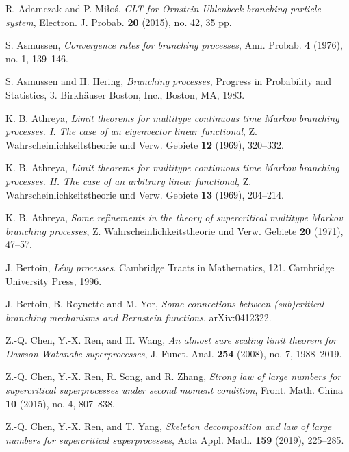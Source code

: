 \documentclass[12pt,a4paper]{amsart}
\theoremstyle{plain}
\theoremstyle{definition}
\numberwithin{equation}{section}
\begin{document}
\begin{thebibliography}{10}

  R. Adamczak and P. Mi{\l}o\'{s}, \emph{C{LT} for {O}rnstein-{U}hlenbeck branching particle system},
  Electron. J. Probab. \textbf{20} (2015), no. 42, 35 pp.

  S. Asmussen, \emph{Convergence rates for branching processes},
  Ann. Probab.  \textbf{4} (1976), no. 1, 139--146.

  S. Asmussen and H. Hering, \emph{Branching processes},
  Progress in Probability and Statistics, 3. Birkh\"{a}user Boston, Inc., Boston, MA, 1983.

  K. B. Athreya,
  \emph{Limit theorems for multitype continuous time {M}arkov branching processes. {I}. {T}he case of an eigenvector linear functional},
  Z. Wahrscheinlichkeitstheorie und Verw. Gebiete \textbf{12} (1969), 320--332.

  K. B. Athreya,
  \emph{Limit theorems for multitype continuous time {M}arkov branching processes. {II}. {T}he case of an arbitrary linear functional},
  Z. Wahrscheinlichkeitstheorie und Verw. Gebiete \textbf{13} (1969), 204--214.

  K. B. Athreya,
  \emph{Some refinements in the theory of supercritical multitype {M}arkov branching processes},
  Z. Wahrscheinlichkeitstheorie und Verw. Gebiete \textbf{20} (1971), 47--57.


J. Bertoin,
\emph{L\'evy processes}.
Cambridge Tracts in Mathematics, 121. Cambridge
University Press, 1996.

J. Bertoin, B. Roynette and M. Yor,
\emph{Some connections between (sub)critical branching mechanisms and Bernstein functions}.
arXiv:0412322.


  Z.-Q. Chen, Y.-X. Ren, and H. Wang,
  \emph{An almost sure scaling limit theorem for {D}awson-{W}atanabe superprocesses},
  J. Funct. Anal. \textbf{254} (2008), no. 7, 1988--2019.

   Z.-Q. Chen, Y.-X. Ren, R. Song, and R. Zhang,
   \emph{Strong law of large numbers for supercritical superprocesses under second moment condition},
   Front. Math. China \textbf{10} (2015), no. 4, 807--838.

   Z.-Q. Chen, Y.-X. Ren, and T. Yang,
   \emph{Skeleton decomposition and law of large numbers for supercritical superprocesses},
   Acta Appl. Math. \textbf{159} (2019), 225--285.


\end{thebibliography}
\end{document}
